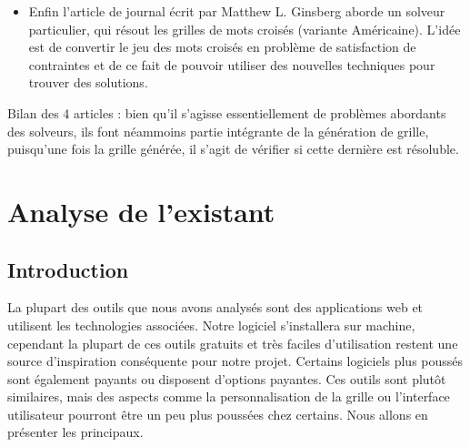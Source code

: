 \documentclass [ 11 pt ] {article}
\begin{document}
\begin{itemize}
            \item Enfin l'article de journal \cite{CaI} écrit par Matthew L. Ginsberg aborde un solveur particulier, qui résout les grilles de mots croisés (variante Américaine). L'idée est de convertir le jeu des mots croisés en problème de satisfaction de contraintes et de ce fait de pouvoir utiliser des nouvelles techniques pour trouver des solutions.
        \end{itemize}
        
        Bilan des 4 articles : bien qu'il s'agisse essentiellement de problèmes abordants des solveurs, ils font néammoins partie intégrante de la génération de grille, puisqu'une fois la grille générée, il s'agit de vérifier si cette dernière est résoluble. 
    

\section{Analyse de l'existant} %

    \subsection{Introduction}
        \hspace{1cm}La plupart des outils que nous avons analysés sont des applications web et utilisent les technologies associées. Notre logiciel s'installera sur machine, cependant la plupart de ces outils gratuits et très faciles d’utilisation restent une source d'inspiration conséquente pour notre projet. Certains logiciels plus poussés sont également payants ou disposent d'options payantes. Ces outils sont plutôt similaires, mais des aspects comme la personnalisation de la grille ou l’interface utilisateur pourront être un peu plus poussées chez certains. Nous allons en présenter les principaux. 
    
\end{document}
